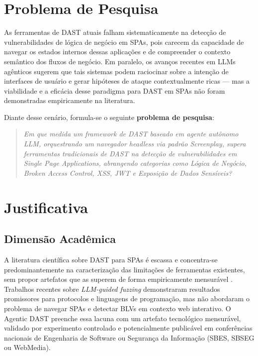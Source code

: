 \documentclass[
    12pt,
    openany,
    oneside,
    a4paper,
    brazil
]{abntex2}
\begin{document}
\chapter{Problema de Pesquisa}

As ferramentas de DAST atuais falham sistematicamente na detecção de
vulnerabilidades de lógica de negócio em SPAs, pois carecem da
capacidade de navegar os estados internos dessas aplicações e de
compreender o contexto semântico dos fluxos de negócio. Em paralelo,
os avanços recentes em LLMs agênticos sugerem que tais sistemas podem
raciocinar sobre a intenção de interfaces de usuário e gerar hipóteses
de ataque contextualmente ricas --- mas a viabilidade e a eficácia
desse paradigma para DAST em SPAs não foram demonstradas empiricamente
na literatura.

Diante desse cenário, formula-se o seguinte \textbf{problema de
pesquisa}:

\begin{quote}
  \textit{Em que medida um framework de DAST baseado em agente autônomo
  LLM, orquestrando um navegador headless via padrão Screenplay,
  supera ferramentas tradicionais de DAST na detecção de vulnerabilidades
  em Single Page Applications, abrangendo categorias como Lógica de Negócio,
  Broken Access Control, XSS, JWT e Exposição de Dados Sensíveis?}
\end{quote}

\chapter{Justificativa}

\section{Dimensão Acadêmica}

A literatura científica sobre DAST para SPAs é escassa e concentra-se
predominantemente na caracterização das limitações de ferramentas
existentes, sem propor artefatos que as superem de forma empiricamente
mensurável \cite{brightsec2024, stackhawk2024}. Trabalhos recentes
sobre \textit{LLM-guided fuzzing} \cite{yang2025hybrid} demonstraram
resultados promissores para protocolos e linguagens de programação, mas
não abordaram o problema de navegar SPAs e detectar BLVs em contexto
web interativo. O Agentic DAST preenche essa lacuna com um artefato
tecnológico mensurável, validado por experimento controlado e
potencialmente publicável em conferências nacionais de Engenharia de
Software ou Segurança da Informação (SBES, SBSEG ou WebMedia).
\end{document}
